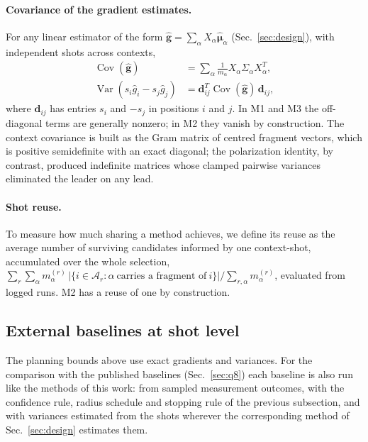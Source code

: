 \documentclass[aps,pra,reprint,superscriptaddress,nofootinbib]{revtex4-2}
\begin{document}
\paragraph{Covariance of the gradient estimates.} For any linear estimator of the form $\hat{\boldsymbol g}=\sum_\alpha X_\alpha\hat{\boldsymbol\mu}_\alpha$ (Sec.~\ref{sec:design}), with independent shots across contexts,
\begin{equation}
\begin{split}
\operatorname{Cov}(\hat{\boldsymbol g})&=\sum_\alpha\frac{1}{m_\alpha}X_\alpha\Sigma_\alpha X_\alpha^{T},\\
\operatorname{Var}(s_i\hat g_i-s_j\hat g_j)&=\boldsymbol d_{ij}^{T}\operatorname{Cov}(\hat{\boldsymbol g})\,\boldsymbol d_{ij},
\end{split}
\label{eq:cov}
\end{equation}
where $\boldsymbol d_{ij}$ has entries $s_i$ and $-s_j$ in positions $i$ and $j$. In M1 and M3 the off-diagonal terms are generally nonzero; in M2 they vanish by construction. The context covariance is built as the Gram matrix of centred fragment vectors, which is positive semidefinite with an exact diagonal; the polarization identity, by contrast, produced indefinite matrices whose clamped pairwise variances eliminated the leader on any lead.

\paragraph{Shot reuse.} To measure how much sharing a method achieves, we define its reuse as the average number of surviving candidates informed by one context-shot, accumulated over the whole selection, $\sum_r\sum_\alpha m^{(r)}_\alpha\,\lvert\{i\in\mathcal A_r:\alpha\ \text{carries a fragment of}\ i\}\rvert/\sum_{r,\alpha}m^{(r)}_\alpha$, evaluated from logged runs. M2 has a reuse of one by construction.

\subsection{External baselines at shot level}
\label{sec:external}

The planning bounds above use exact gradients and variances. For the comparison with the published baselines (Sec.~\ref{sec:q8}) each baseline is also run like the methods of this work: from sampled measurement outcomes, with the confidence rule, radius schedule and stopping rule of the previous subsection, and with variances estimated from the shots wherever the corresponding method of Sec.~\ref{sec:design} estimates them.
\end{document}

